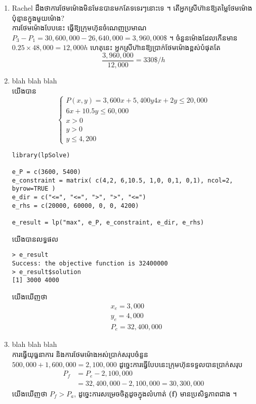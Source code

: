 \begin{enumerate}[label={\textbf{(\alph*)}}]
 \item Rachel ដឹងថាការថែមម៉ោងមិនមែនបានមកតែទទេរៗនោះទេ ។ តើអ្នកស្រីហ៊ានឱ្យតម្លៃថែមម៉ោងប៉ុន្មានក្នុងមួយម៉ោង?\\[1cm]
   ការថែមម៉ោងបែបនេះ ធ្វើឱ្យក្រុមហ៊ុនចំណេញប្រមាណ
   $P_3-P_1=30,600,000-26,640,000=3,960,000\$$ ។
   ចំនួនម៉ោងដែលកើនមាន $0.25\times 48,000=12,000h$  ហេតុនេះ អ្នកស្រីហ៊ានឱ្យប្រាក់ថែមម៉ោងខ្ពស់បំផុតតែ
   \[\frac{3,960,000}{12,000}=330\$/h\]

   
 \item blah blah blah \\[1cm]
   យើងបាន
   \[
     \begin{cases}
       P(x,y)= 3,600x + 5,400y
       4x+2y\leq 20,000\\
       6x+10.5y \leq 60,000\\
       x>0\\
       y>0\\
       y\leq 4,200
     \end{cases}
   \]
   \begin{lstlisting}
library(lpSolve)

e_P = c(3600, 5400)
e_constraint = matrix( c(4,2, 6,10.5, 1,0, 0,1, 0,1), ncol=2, byrow=TRUE )
e_dir = c("<=", "<=", ">", ">", "<=")
e_rhs = c(20000, 60000, 0, 0, 4200)

e_result = lp("max", e_P, e_constraint, e_dir, e_rhs)
   \end{lstlisting}
   យើងបានលទ្ធផល
   \begin{verbatim}
> e_result
Success: the objective function is 32400000 
> e_result$solution 
[1] 3000 4000
   \end{verbatim}
   យើងឃើញថា
   \begin{align*}
     &x_e=3,000\\
     &y_e=4,000\\
     &P_e=32,400,000 
   \end{align*}

   
 \item blah blah blah\\[1cm]
   ការធ្វើយុ​ធ្ធនាការ និងការថែមម៉ោងអស់ប្រាក់សរុបចំនួន
   $ 500,000 + 1,600,000=2,100,000$
   ដូច្នេះការធ្វើបែបនេះក្រុមហ៊ុនទទួលបានប្រាក់សរុប
   \begin{align*}
     P_f
     &= P_e-2,100,000\\
     &= 32,400,000 - 2,100,000=30,300,000
   \end{align*}
   យើងឃើញថា $P_f>P_a$, ដូច្នេះការសម្រេចចិត្តដូចក្នុងលំហាត់ \textbf{(f)}
   មានប្រសិទ្ធភាពជាង ។


\end{enumerate}
